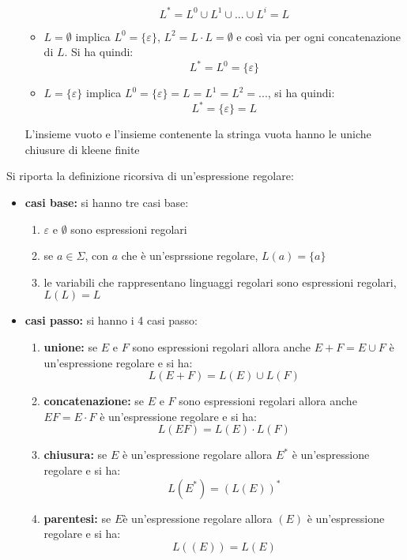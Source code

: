 \documentclass[a4paper,12pt, oneside]{book}
\begin{document}
\begin{itemize}
\begin{itemize}
		            $$L^*=L^0\cup L^1\cup ... \cup L^i=L$$
		      \item $L=\emptyset$ implica $L^0=\{\varepsilon\}$, $L^2=L\cdot L=\emptyset$ e così via per ogni concatenazione di $L$. Si ha quindi:
		            $$L^*=L^0=\{\varepsilon\}$$
		      \item $L=\{\varepsilon\}$ implica $L^0=\{\varepsilon\}=L=L^1=L^2=...$, si ha quindi:
		            $$L^*=\{\varepsilon\}=L$$
	      \end{itemize}
	      L'insieme vuoto e l'insieme contenente la stringa vuota hanno le uniche chiusure di kleene finite
\end{itemize}
\begin{definizione}
	Si riporta la definizione ricorsiva di un'espressione regolare:
	\begin{itemize}
		\item \textbf{casi base:} si hanno tre casi base:
		      \begin{enumerate}
			      \item $\varepsilon$ e $\emptyset$ sono espressioni regolari
			      \item se $a\in \Sigma$, con $a$ che è un'esprssione regolare, $L(a)=\{a\}$
			      \item le variabili che rappresentano linguaggi regolari sono espressioni regolari, $L(L)=L$
		      \end{enumerate}
		\item \textbf{casi passo:} si hanno i 4 casi passo:
		      \begin{enumerate}
			      \item \textbf{unione:} se $E$ e $F$ sono espressioni regolari allora anche $E+F=E\cup F$ è un'espressione regolare e si ha:
			            $$L(E+F)=L(E)\cup L(F)$$
			      \item \textbf{concatenazione:} se $E$ e $F$ sono espressioni regolari allora anche $EF=E\cdot F$ è un'espressione regolare e si ha:
			            $$L(EF)=L(E)\cdot L(F)$$
			      \item \textbf{chiusura:} se $E$ è un'espressione regolare allora $E^*$ è un'espressione regolare e si ha:
			            $$L(E^*)=(L(E))^*$$
			      \item \textbf{parentesi:} se $E$è un'espressione regolare allora $(E)$ è un'espressione regolare e si ha:
			            $$L((E))=L(E)$$
		      \end{enumerate}
	\end{itemize}
	\newpage
	\begin{esempio}

\end{esempio}
\end{definizione}
\end{document}
